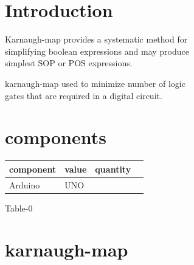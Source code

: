 \documentclass[10pt, a4paper]{article}
\title{\mytitle}
\author{\myauthor\hspace{1em}\\\contact\\IITH\hspace{0.5em}-\hspace{0.5em}\mymodule}
\date{}
\begin{document}
 \maketitle
 \tableofcontents
 \begin{abstract}
The objective of this manual is to show how to \\verify 
following min-terms.
    
    f(A,B,C,D) = $\sum m(2,3,8,10,11,12,14,15)$
    
using karnaugh-map
    
 \end{abstract}
    
 

 \section{Introduction}
    Karnaugh-map provides a systematic method for
    \\simplifying boolean expressions and may produce
    \\simplest SOP or POS expressions.
    
    
    karnaugh-map used to minimize number of logic
    \\gates that are required in a digital circuit.
    
    
    
    
    
    \section{components}
    \begin{tabularx}{0.4\textwidth} { 
  | >{\centering\arraybackslash}X 
  | >{\centering\arraybackslash}X 
  | >{\centering\arraybackslash}X 
  | >{\centering\arraybackslash}X | }
  \hline
  component & value & quantity \\
  \hline
  Arduino & UNO & 1 \\
  \hline
  
  \end{tabularx}
  \begin{center}
      Table-0
  \end{center}
  
  
  

    
    
 
 
 \section{karnaugh-map}
\end{document}
